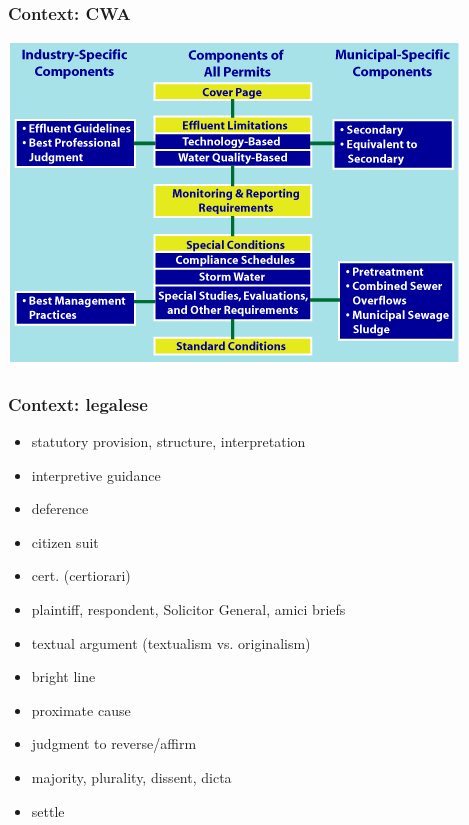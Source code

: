 \documentclass[aspectratio=169]{beamer}
\theoremstyle{principle}
\begin{document}
\begin{frame}
\frametitle{Context: CWA}

\begin{center}
     \includegraphics[scale=0.8]{NPDES_Permit_Components_EPA_chart.png}
\end{center}

\end{frame}

\begin{frame}
\frametitle{Context: legalese}

\begin{itemize}
\item statutory provision, structure, interpretation
\item interpretive guidance
\item deference
\item citizen suit
\item cert. (certiorari)
\item plaintiff, respondent, Solicitor General, amici briefs
\item textual argument (textualism vs. originalism)
\item bright line
\item proximate cause 
\item judgment to reverse/affirm
\item majority, plurality, dissent, dicta
\item settle
\end{itemize}
\end{frame}
\end{document}
